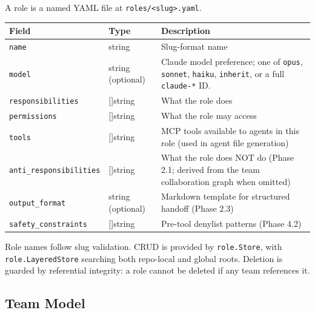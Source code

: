 \documentclass[a4paper,10pt]{article}
\newcommand{\field}[1]{\texttt{#1}}
\newcommand{\fpath}[1]{\texttt{#1}}
\begin{document}
A role is a named YAML file at \fpath{roles/<slug>.yaml}.

\begin{center}
\begin{tabular}{@{}llp{6.5cm}@{}}
\toprule
\textbf{Field} & \textbf{Type} & \textbf{Description} \\
\midrule
\field{name}             & string       & Slug-format name \\
\field{model}            & string (optional) & Claude model preference;
                                          one of \texttt{opus},
                                          \texttt{sonnet}, \texttt{haiku},
                                          \texttt{inherit}, or a full
                                          \texttt{claude-*} ID. \\
\field{responsibilities} & []string     & What the role does \\
\field{permissions}      & []string     & What the role may access \\
\field{tools}            & []string     & MCP tools available to agents
                                          in this role (used in agent
                                          file generation) \\
\field{anti\_responsibilities} & []string & What the role does NOT do
                                          (Phase 2.1; derived from the
                                          team collaboration graph
                                          when omitted) \\
\field{output\_format}   & string (optional) & Markdown template for
                                          structured handoff (Phase
                                          2.3) \\
\field{safety\_constraints} & []string  & Pre-tool denylist
                                          patterns (Phase 4.2) \\
\bottomrule
\end{tabular}
\end{center}

Role names follow slug validation.  CRUD is provided by
\texttt{role.Store}, with \texttt{role.LayeredStore} searching both
repo-local and global roots.  Deletion is guarded by referential
integrity: a role cannot be deleted if any team references it.

\subsection{Team Model}
\end{document}
